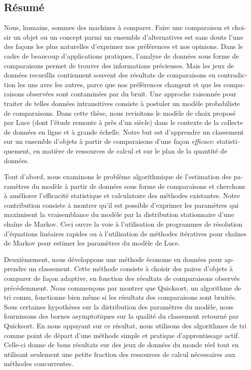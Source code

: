 \begin{otherlanguage}{french}
\chapter*{Résumé}

Nous, humains, sommes des machines à comparer.
Faire une comparaison et choisir un objet ou un concept parmi un ensemble d'alternatives est sans doute l'une des façons les plus naturelles d'exprimer nos préférences et nos opinions.
Dans le cadre de beaucoup d'applications pratiques, l'analyse de données sous forme de comparaisons permet de trouver des informations précieuses.
Mais les jeux de données recueillis contiennent souvent des résultats de comparaisons en contradiction les uns avec les autres, parce que nos préférences changent et que les comparaisons observées sont contaminées par du bruit.
Une approche raisonnée pour traiter de telles données intransitives consiste à postuler un modèle probabiliste de comparaisons.
Dans cette thèse, nous revisitons le modèle de choix proposé par Luce (dont l'étude remonte à près d'un siècle) dans le contexte de la collecte de données en ligne et à grande échelle.
Notre but est d'apprendre un classement sur un ensemble d'objets à partir de comparaisons d'une façon \emph{efficace}: statistiquement, en matière de ressources de calcul et sur le plan de la quantité de données.

Tout d'abord, nous examinons le problème algorithmique de l'estimation des paramètres du modèle à partir de données sous forme de comparaisons et cherchons à améliorer l'efficacité statistique et calculatoire des méthodes existantes.
Notre contribution consiste à montrer qu'il est possible d'exprimer les paramètres qui maximisent la vraisemblance du modèle par la distribution stationnaire d'une chaîne de Markov.
Ceci ouvre la voie à l'utilisation de programmes de résolution d'équations linéaires rapides ou à l'utilisation de méthodes itératives pour chaînes de Markov pour estimer les paramètres du modèle de Luce.

Deuxièmement, nous développons une méthode économe en données pour apprendre un classement.
Cette méthode consiste à choisir des paires d'objets à comparer de façon adaptive, en fonction des résultats de comparaisons observés précédemment.
Nous commençons par montrer que Quicksort, un algorithme de tri connu, fonctionne bien même si les résultats des comparaisons sont bruités.
Sous certaines hypothèses sur la distribution des paramètres du modèle, nous fournissons des bornes asymptotiques sur la qualité du classement retourné par Quicksort.
En nous appuyant sur ce résultat, nous utilisons des algorithmes de tri comme point de départ d'une méthode simple et pratique d'apprentissage actif.
Celle-ci donne de bons résultats sur des jeux de données du monde réel tout en utilisant seulement une petite fraction des ressources de calcul nécessaires aux méthodes concurrentes.


\end{otherlanguage}
